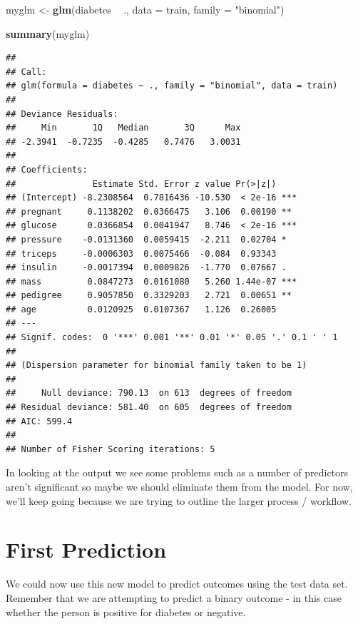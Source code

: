 \documentclass[]{book}
\newenvironment{Shaded}{\begin{snugshade}}{\end{snugshade}}
\newcommand{\KeywordTok}[1]{\textcolor[rgb]{0.13,0.29,0.53}{\textbf{#1}}}
\newcommand{\DataTypeTok}[1]{\textcolor[rgb]{0.13,0.29,0.53}{#1}}
\newcommand{\StringTok}[1]{\textcolor[rgb]{0.31,0.60,0.02}{#1}}
\newcommand{\OperatorTok}[1]{\textcolor[rgb]{0.81,0.36,0.00}{\textbf{#1}}}
\newcommand{\NormalTok}[1]{#1}
\begin{document}
\begin{Shaded}
\begin{Highlighting}[]
\NormalTok{myglm <-}\StringTok{ }\KeywordTok{glm}\NormalTok{(diabetes }\OperatorTok{~}\StringTok{ }\NormalTok{.,}
             \DataTypeTok{data =}\NormalTok{ train,}
             \DataTypeTok{family =} \StringTok{"binomial"}\NormalTok{)}

\KeywordTok{summary}\NormalTok{(myglm)}
\end{Highlighting}
\end{Shaded}

\begin{verbatim}
## 
## Call:
## glm(formula = diabetes ~ ., family = "binomial", data = train)
## 
## Deviance Residuals: 
##     Min       1Q   Median       3Q      Max  
## -2.3941  -0.7235  -0.4285   0.7476   3.0031  
## 
## Coefficients:
##               Estimate Std. Error z value Pr(>|z|)    
## (Intercept) -8.2308564  0.7816436 -10.530  < 2e-16 ***
## pregnant     0.1138202  0.0366475   3.106  0.00190 ** 
## glucose      0.0366854  0.0041947   8.746  < 2e-16 ***
## pressure    -0.0131360  0.0059415  -2.211  0.02704 *  
## triceps     -0.0006303  0.0075466  -0.084  0.93343    
## insulin     -0.0017394  0.0009826  -1.770  0.07667 .  
## mass         0.0847273  0.0161080   5.260 1.44e-07 ***
## pedigree     0.9057850  0.3329203   2.721  0.00651 ** 
## age          0.0120925  0.0107367   1.126  0.26005    
## ---
## Signif. codes:  0 '***' 0.001 '**' 0.01 '*' 0.05 '.' 0.1 ' ' 1
## 
## (Dispersion parameter for binomial family taken to be 1)
## 
##     Null deviance: 790.13  on 613  degrees of freedom
## Residual deviance: 581.40  on 605  degrees of freedom
## AIC: 599.4
## 
## Number of Fisher Scoring iterations: 5
\end{verbatim}

In looking at the output we see some problems such as a number of
predictors aren't significant so maybe we should eliminate them from the
model. For now, we'll keep going because we are trying to outline the
larger process / workflow.

\section{First Prediction}\label{first-prediction}

We could now use this new model to predict outcomes using the test data
set. Remember that we are attempting to predict a binary outcome - in
this case whether the person is positive for diabetes or negative.
\end{document}
